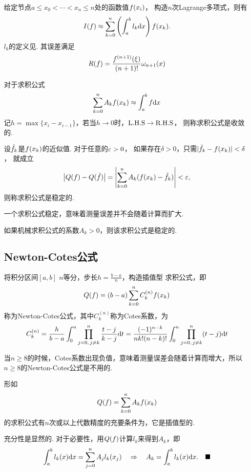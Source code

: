   \begin{defi}[插值求积公式]
    给定节点$a\le x_0 < \cdots < x_n \le n$处的函数值$\mathnormal{f}(x_i)$，
    构造$n$次Lagrange多项式，则有
    \[
      I(\mathnormal{f}) \approx \sum_{k=0}^n\left( \int_a^bl_k\mathrm{d} x \right)\mathnormal{f}(x_k).
    \]
    $l_k$的定义见. 其误差满足
    \[
      R(\mathnormal{f}) = \frac{\mathnormal{f}^{(n+1)}(\xi)}{(n+1)!}\omega_{n+1}(x)
    \]
  \end{defi}

  \begin{defi}[收敛]
    对于求积公式
    \[
      \sum_{k=0}^n A_k\mathnormal{f}(x_k) \approx \int_a^b\mathnormal{f}\mathrm{d} x
    \]
    记$h = \max\{x_i-x_{i-1}\}$，若当$h\to 0$时，$\text{L.H.S}\to\text{R.H.S}$，
    则称求积公式是收敛的.
  \end{defi}

  \begin{defi}[稳定]
    设$\tilde{\mathnormal{f}}_k$是$\mathnormal{f}(x_k)$的近似值. 对于任意的$\varepsilon>0$，
    如果存在$\delta>0$，只需$|\tilde{\mathnormal{f}}_k - \mathnormal{f}(x_k)|<\delta$，
    就成立
    \[
      \left| Q(\mathnormal{f}) - Q(\tilde{\mathnormal{f}}) \right| =
      \left| \sum_{k=0}^nA_k(\mathnormal{f}(x_k) - \tilde{\mathnormal{f}}_k) \right| < \varepsilon,
    \]
    则称求积公式是稳定的.
  \end{defi}
  \remark
    一个求积公式稳定，意味着测量误差并不会随着计算而扩大.

  \begin{thm}[稳定性条件]
    如果机械求积公式的系数$A_k>0$，则该求积公式是稳定的.
  \end{thm}

\subsection{Newton-Cotes公式}
  \begin{thm}
    将积分区间$[a, b]$ $n$等分，步长$h=\frac{b-a}{n}$，构造插值型
    求积公式，即
    \[
      Q(\mathnormal{f}) = (b-a)\sum_{k=0}^n C_k^{(n)}\mathnormal{f}(x_k)
    \]
    称为Newton-Cotes公式，其中$C_k^{(n)}$称为Cotes系数，为
    \[
      C_k^{(n)} = \frac{h}{b-a}\int_0^n \prod_{j=0,\,j\ne k}^n\frac{t-j}{k-j}\mathrm{d} t
       = \frac{(-1)^{n-k}}{nk!(n-k)!}\int_0^n\prod_{j=0,\,j\ne k}^n(t-j)\mathrm{d} t
    \]
  \end{thm}
  \remark
    当$n\ge 8$的时候，Cotes系数出现负值，意味着测量误差会随着计算而增大，所以
    $n\ge 8$的Newton-Cotes公式是不用的.

  \begin{thm}[插值型求积公式的代数精度]
    形如
    \[
      Q(\mathnormal{f}) = \sum_{k=0}^nA_k\mathnormal{f}(x_k)
    \]
    的求积公式有$n$次或以上代数精度的充要条件为，它是插值型的.
  \end{thm}
  \proof
    充分性是显然的. 对于必要性，用$Q(\mathnormal{f})$计算$l_k$来得到$A_k$，即
    \[
      \int_a^bl_k(x)\mathrm{d} x = \sum_{j=0}^nA_jl_k(x_j) \quad\Rightarrow\quad
      A_k = \int_a^bl_k(x)\mathrm{d} x.\quad\blacksquare
    \]

